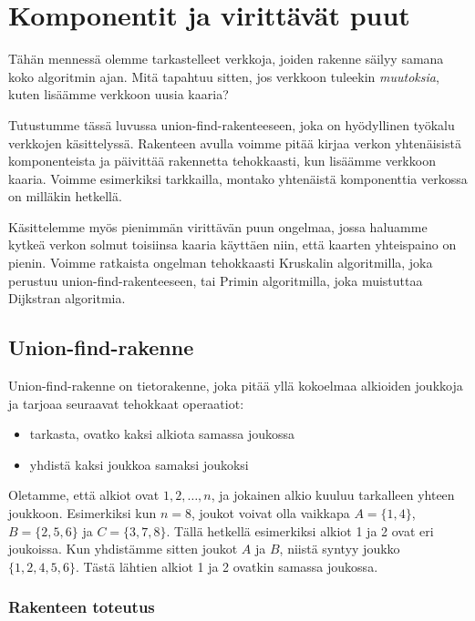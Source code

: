 \chapter{Komponentit ja virittävät puut}

Tähän mennessä olemme tarkastelleet verkkoja,
joiden rakenne säilyy samana koko algoritmin ajan.
Mitä tapahtuu sitten, jos verkkoon tuleekin \emph{muutoksia},
kuten lisäämme verkkoon uusia kaaria?

Tutustumme tässä luvussa union-find-rakenteeseen,
joka on hyödyl\-linen työkalu verkkojen käsittelyssä.
Rakenteen avulla voimme pitää kirjaa verkon yhtenäisistä
komponenteista ja päivittää rakennetta tehokkaasti,
kun lisäämme verkkoon kaaria.
Voimme esimerkiksi tarkkailla, montako yhte\-näistä
komponenttia verkossa on milläkin hetkellä.

Käsittelemme myös pienimmän virittävän puun ongelmaa,
jossa haluamme kytkeä verkon solmut toisiinsa kaaria käyttäen niin,
että kaarten yhteispaino on pienin.
Voimme ratkaista ongelman tehokkaasti Kruskalin algoritmilla,
joka perustuu union-find-rakenteeseen,
tai Primin algoritmilla, joka muistuttaa Dijkstran algoritmia.

\section{Union-find-rakenne}


Union-find-rakenne on tietorakenne, joka
pitää yllä kokoelmaa alkioiden joukkoja ja tarjoaa
seuraavat tehokkaat operaatiot:

\begin{itemize}
\item tarkasta, ovatko kaksi alkiota samassa joukossa
\item yhdistä kaksi joukkoa samaksi joukoksi
\end{itemize}

Oletamme, että alkiot ovat $1,2,\dots,n$,
ja jokainen alkio kuuluu tarkalleen yhteen joukkoon.
Esimerkiksi kun $n=8$, joukot voivat olla vaikkapa
$A=\{1,4\}$, $B=\{2,5,6\}$ ja $C=\{3,7,8\}$.
Tällä hetkellä esimerkiksi alkiot 1 ja 2 ovat eri joukoissa.
Kun yhdistämme sitten joukot $A$ ja $B$,
niistä syntyy joukko $\{1,2,4,5,6\}$.
Tästä lähtien alkiot 1 ja 2 ovatkin samassa joukossa.

\subsection{Rakenteen toteutus}


